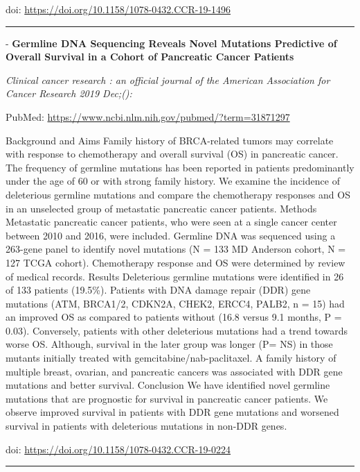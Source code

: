 \documentclass[
]{article}
\renewcommand{\linethickness}{0.05em}
\begin{document}
doi: \url{https://doi.org/10.1158/1078-0432.CCR-19-1496}

\begin{center}\rule{0.5\linewidth}{\linethickness}\end{center}

- \textbf{Germline DNA Sequencing Reveals Novel Mutations Predictive of
Overall Survival in a Cohort of Pancreatic Cancer Patients}

\emph{Clinical cancer research : an official journal of the American
Association for Cancer Research 2019 Dec;():}

PubMed: \url{https://www.ncbi.nlm.nih.gov/pubmed/?term=31871297}

Background and Aims Family history of BRCA-related tumors may correlate
with response to chemotherapy and overall survival (OS) in pancreatic
cancer. The frequency of germline mutations has been reported in
patients predominantly under the age of 60 or with strong family
history. We examine the incidence of deleterious germline mutations and
compare the chemotherapy responses and OS in an unselected group of
metastatic pancreatic cancer patients. Methods Metastatic pancreatic
cancer patients, who were seen at a single cancer center between 2010
and 2016, were included. Germline DNA was sequenced using a 263-gene
panel to identify novel mutations (N = 133 MD Anderson cohort, N = 127
TCGA cohort). Chemotherapy response and OS were determined by review of
medical records. Results Deleterious germline mutations were identified
in 26 of 133 patients (19.5\%). Patients with DNA damage repair (DDR)
gene mutations (ATM, BRCA1/2, CDKN2A, CHEK2, ERCC4, PALB2, n = 15) had
an improved OS as compared to patients without (16.8 versus 9.1 months,
P = 0.03). Conversely, patients with other deleterious mutations had a
trend towards worse OS. Although, survival in the later group was longer
(P= NS) in those mutants initially treated with
gemcitabine/nab-paclitaxel. A family history of multiple breast,
ovarian, and pancreatic cancers was associated with DDR gene mutations
and better survival. Conclusion We have identified novel germline
mutations that are prognostic for survival in pancreatic cancer
patients. We observe improved survival in patients with DDR gene
mutations and worsened survival in patients with deleterious mutations
in non-DDR genes.

doi: \url{https://doi.org/10.1158/1078-0432.CCR-19-0224}

\begin{center}\rule{0.5\linewidth}{\linethickness}\end{center}
\end{document}
